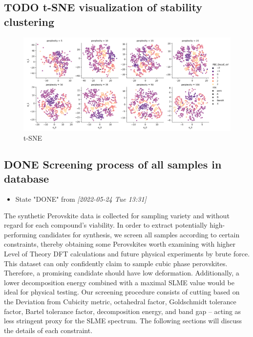 \documentclass[twoside, twocolumn, 9pt, draft]{article}
\begin{document}
\subsection*{{\bfseries\sffamily TODO} t-SNE visualization of stability clustering}
\label{sec:orgd1b4029}
\begin{figure}
\centering
\includegraphics[width=.9\linewidth]{tsne_comp_DecoE_clusters.png}
\caption{\label{fig:pca} t-SNE}
\end{figure}

\subsection*{{\bfseries\sffamily DONE} Screening process of all samples in database}
\label{sec:orgbefe2c0}
\begin{itemize}
\item State "DONE"       from              \textit{[2022-05-24 Tue 13:31]}
\end{itemize}
The synthetic Perovskite data is collected for sampling variety and
without regard for each compound's viability. In order to extract
potentially high-performing candidates for synthesis, we screen all
samples according to certain constraints, thereby obtaining some
Perovskites worth examining with higher Level of Theory DFT
calculations and future physical experiments by brute force. This
dataset can only confidently claim to sample cubic phase
perovskites. Therefore, a promising candidate should have low
deformation. Additionally, a lower decomposition energy combined with
a maximal SLME value would be ideal for physical testing. Our
screening procedure consists of cutting based on the Deviation from
Cubicity metric, octahedral factor, Goldschmidt tolerance factor,
Bartel tolerance factor, decomposition energy, and band gap -- acting
as less stringent proxy for the SLME spectrum. The following sections
will discuss the details of each constraint.
\end{document}
